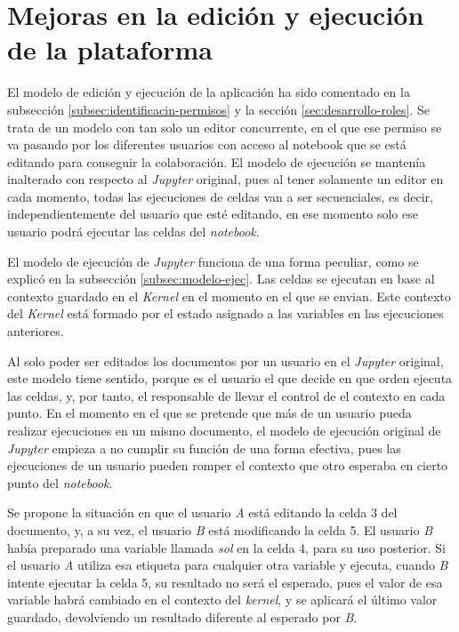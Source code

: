 \documentclass[11pt,spanish,listoffigures]{tfgetsinf}
\begin{document}

\section{Mejoras en la edición y ejecución de la plataforma}
\label{sec:mejoras-ejec}

El modelo de edición y ejecución de la aplicación ha sido comentado en la subsección \ref{subsec:identificacin-permisos} y la sección \ref{sec:desarrollo-roles}. Se trata de un modelo con tan solo un editor concurrente, en el que ese permiso se va pasando por los diferentes usuarios con acceso al notebook que se está editando para conseguir la colaboración. El modelo de ejecución se mantenía inalterado con respecto al \textit{Jupyter} original, pues al tener solamente un editor en cada momento, todas las ejecuciones de celdas van a ser secuenciales, es decir, independientemente del usuario que esté editando, en ese momento solo ese usuario podrá ejecutar las celdas del \textit{notebook}.

El modelo de ejecución de \textit{Jupyter} funciona de una forma peculiar, como se explicó en la subsección \ref{subsec:modelo-ejec}. Las celdas se ejecutan en base al contexto guardado en el \textit{Kernel} en el momento en el que se envian. Este contexto del \textit{Kernel} está formado por el estado asignado a las variables en las ejecuciones anteriores. 

Al solo poder ser editados los documentos por un usuario en el \textit{Jupyter} original, este modelo tiene sentido, porque es el usuario el que decide en que orden ejecuta las celdas, y, por tanto, el  responsable de llevar el control de el contexto en cada punto. En el momento en el que se pretende que más de un usuario pueda realizar ejecuciones en un mismo documento, el modelo de ejecución original de \textit{Jupyter} empieza a no cumplir su función de una forma efectiva, pues las ejecuciones de un usuario pueden romper el contexto que otro esperaba en cierto punto del \textit{notebook}.

Se propone la situación en que el usuario \textit{A} está editando la celda 3 del documento, y, a su vez, el usuario \textit{B} está modificando la celda 5. El usuario \textit{B} había preparado una variable llamada \textit{sol} en la celda 4, para su uso posterior. Si el usuario \textit{A} utiliza esa etiqueta para cualquier otra variable y ejecuta, cuando \textit{B} intente ejecutar la celda 5, su resultado no será el esperado, pues el valor de esa variable habrá cambiado en el contexto del \textit{kernel}, y se aplicará el último valor guardado, devolviendo un resultado diferente al esperado por \textit{B}.
\end{document}
